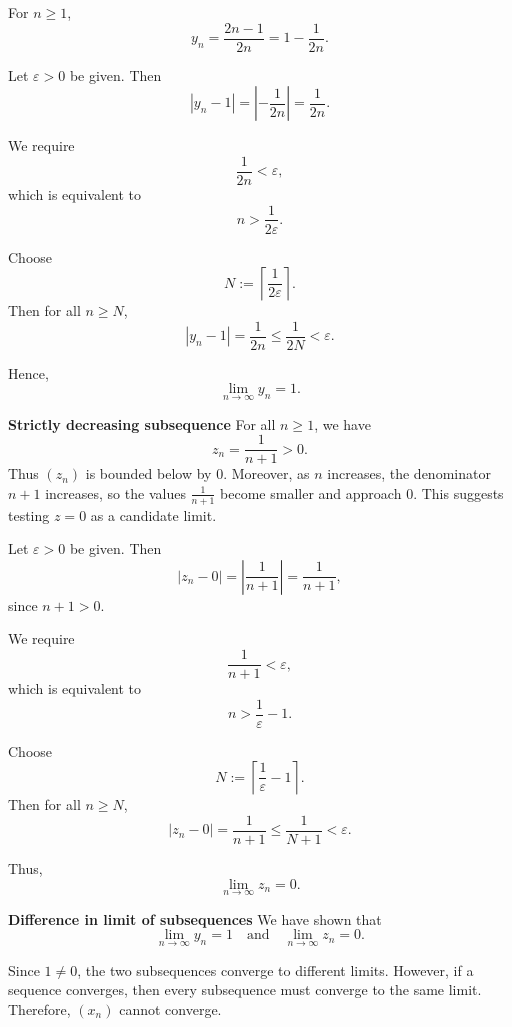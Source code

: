 \documentclass[12pt]{article}
\begin{document}
For $n \ge 1$,
\[
	y_n
	=
	\frac{2n-1}{2n}
	=
	1 - \frac{1}{2n}.
\]

Let $\varepsilon > 0$ be given. Then
\[
	|y_n - 1|
	=
	\left| -\frac{1}{2n} \right|
	=
	\frac{1}{2n}.
\]

We require
\[
	\frac{1}{2n} < \varepsilon,
\]
which is equivalent to
\[
	n > \frac{1}{2\varepsilon}.
\]

Choose
\[
	N := \left\lceil \frac{1}{2\varepsilon} \right\rceil.
\]
Then for all $n \ge N$,
\[
	|y_n - 1|
	=
	\frac{1}{2n}
	\le
	\frac{1}{2N}
	<
	\varepsilon.
\]

Hence,
\[
	\lim_{n \to \infty} y_n = 1.
\]

\bigskip

\textbf{Strictly decreasing subsequence}
For all $n \ge 1$, we have
\[
	z_n = \frac{1}{n+1} > 0.
\]
Thus $(z_n)$ is bounded below by $0$. Moreover, as $n$ increases, the denominator $n+1$ increases, so the values $\frac{1}{n+1}$ become smaller and approach $0$.
This suggests testing $z = 0$ as a candidate limit.

Let $\varepsilon > 0$ be given. Then
\[
	|z_n - 0|
	=
	\left| \frac{1}{n+1} \right|
	=
	\frac{1}{n+1},
\]
since $n+1 > 0$.

We require
\[
	\frac{1}{n+1} < \varepsilon,
\]
which is equivalent to
\[
	n > \frac{1}{\varepsilon} - 1.
\]

Choose
\[
	N := \left\lceil \frac{1}{\varepsilon} - 1 \right\rceil.
\]
Then for all $n \ge N$,
\[
	|z_n - 0|
	=
	\frac{1}{n+1}
	\le
	\frac{1}{N+1}
	<
	\varepsilon.
\]

Thus,
\[
	\lim_{n \to \infty} z_n = 0.
\]

\bigskip

\textbf{Difference in limit of subsequences}
We have shown that
\[
	\lim_{n \to \infty} y_n = 1
	\quad \text{and} \quad
	\lim_{n \to \infty} z_n = 0.
\]

Since $1 \neq 0$, the two subsequences converge to different limits.
However, if a sequence converges, then every subsequence must converge to the same limit.
Therefore, $(x_n)$ cannot converge.
\end{document}
